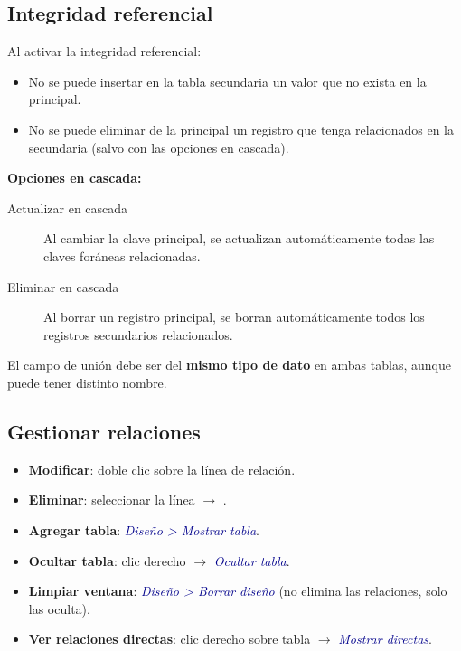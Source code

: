 \documentclass[12pt,a4paper]{article}
\newcommand{\tecla}[1]{\fbox{\small\texttt{#1}}}
\newcommand{\menu}[1]{\textit{\textcolor{darkblue}{#1}}}
\begin{document}
\subsection{Integridad referencial}

Al activar la integridad referencial:
\begin{itemize}
  \item No se puede insertar en la tabla secundaria un valor que no exista en la principal.
  \item No se puede eliminar de la principal un registro que tenga relacionados en la secundaria (salvo con las opciones en cascada).
\end{itemize}

\textbf{Opciones en cascada:}
\begin{description}
  \item[Actualizar en cascada] Al cambiar la clave principal, se actualizan automáticamente todas las claves foráneas relacionadas.
  \item[Eliminar en cascada] Al borrar un registro principal, se borran automáticamente todos los registros secundarios relacionados.
\end{description}

\begin{importante}
El campo de unión debe ser del \textbf{mismo tipo de dato} en ambas tablas, aunque puede tener distinto nombre.
\end{importante}

\subsection{Gestionar relaciones}

\begin{itemize}
  \item \textbf{Modificar}: doble clic sobre la línea de relación.
  \item \textbf{Eliminar}: seleccionar la línea $\rightarrow$ \tecla{Supr}.
  \item \textbf{Agregar tabla}: \menu{Diseño > Mostrar tabla}.
  \item \textbf{Ocultar tabla}: clic derecho $\rightarrow$ \menu{Ocultar tabla}.
  \item \textbf{Limpiar ventana}: \menu{Diseño > Borrar diseño} (no elimina las relaciones, solo las oculta).
  \item \textbf{Ver relaciones directas}: clic derecho sobre tabla $\rightarrow$ \menu{Mostrar directas}.
\end{itemize}
\end{document}
